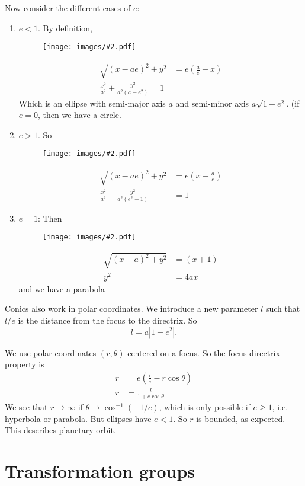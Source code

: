 \documentclass[a4paper]{article}
\theoremstyle{definition}
\newcommand{\img}[2][]{\begin{figure}[ht]\centering\texttt{[image: images/\#2.pdf]}\end{figure}}
\let\stdsection\section
\renewcommand\section{\newpage\stdsection}
\begin{document}
Now consider the different cases of $e$:
\begin{enumerate}
\item $e < 1$. By definition,
  \img{vm_7}
  \begin{align*}
    \sqrt{(x - ae)^2 + y^2} &= e(\frac{a}{e} - x)\\
    \frac{x^2}{a^2} + \frac{y^2}{a^2(a - e^2)} = 1
  \end{align*}
  Which is an ellipse with semi-major axis $a$ and semi-minor axis $a\sqrt{1 - e^2}$. (if $e = 0$, then we have a circle.
\newpage %
\item $e > 1$. So
  \img{vm_8} %
  \begin{align*}
    \sqrt{(x - ae)^2 + y^2} &= e(x - \frac{a}{e})\\
    \frac{x^2}{a^2} - \frac{y^2}{a^2(e^2 - 1)} &= 1
  \end{align*}
\item $e = 1$: Then
  \img{vm_9}
  \begin{align*}
    \sqrt{(x - a)^2 + y^2} &= (x + 1)\\
    y^2 &= 4ax
  \end{align*}
  and we have a parabola
\end{enumerate}

Conics also work in polar coordinates. We introduce a new parameter $l$ such that $l/e$ is the distance from the focus to the directrix. So
\[
l = a|1 - e^2|.
\]

We use polar coordinates $(r, \theta)$ centered on a focus. So the focus-directrix property is
\begin{align*}
  r &= e\left(\frac{l}{e} - r\cos\theta\right)\\
  r &= \frac{l}{1 + e\cos\theta}
\end{align*}
We see that $r\to \infty$ if $\theta \to \cos^{-1}(-1/e)$, which is only possible if $e\geq 1$, i.e. hyperbola or parabola. But ellipses have $e < 1$. So $r$ is bounded, as expected. This describes planetary orbit.

\section{Transformation groups}
\end{document}
